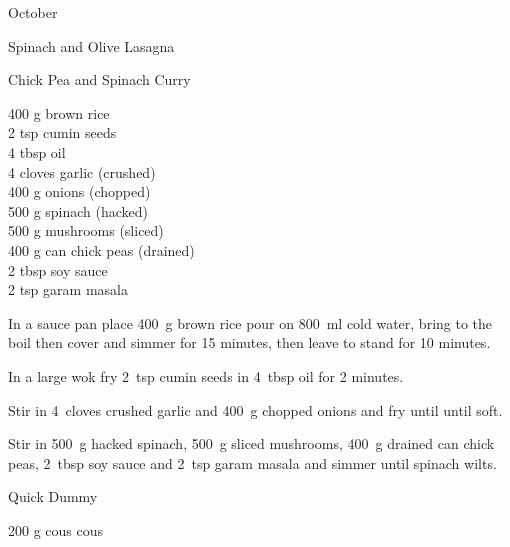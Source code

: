 \begin{menu}{October}
\begin{recipe}{2}{Spinach and Olive Lasagna}
\begin{instructions}
    \end{instructions}
    \end{recipe}%
  
    \begin{recipe}{2}{Chick Pea and Spinach Curry}%
		\begin{ingredients}
		400 g brown rice  \\
	2 tsp cumin seeds  \\
	4 tbsp oil  \\
	4 cloves garlic (crushed) \\
	400 g onions (chopped) \\
	500 g spinach (hacked) \\
	500 g mushrooms (sliced) \\
	400 g can chick peas (drained) \\
	2 tbsp soy sauce  \\
	2 tsp garam masala  \\
	
		\end{ingredients}
	
	
	
    \begin{instructions}
    \item 
    In a
    sauce pan
    place
    400~g  brown rice
    pour on
    800~ml  cold water,
    bring to the boil then cover and simmer for 15 minutes,
    then leave to stand for 10 minutes.
  \item 
        In a large wok fry
        2~tsp  cumin seeds
        in
        4~tbsp  oil
        for 2 minutes.
      \item 
        Stir in
        4~cloves crushed garlic
        and
        400~g chopped onions
        and fry until until soft.
      \item 
        Stir in
        500~g hacked spinach,
        500~g sliced mushrooms,
        400~g drained can chick peas,
        2~tbsp  soy sauce
        and
        2~tsp  garam masala
        and simmer until spinach wilts.
      
    \end{instructions}
    \end{recipe}%
  
    \begin{recipe}{1}{Quick Dummy}%
		\begin{ingredients}
		200 g cous cous  \\
	

\end{ingredients}
\end{recipe}
\end{menu}
